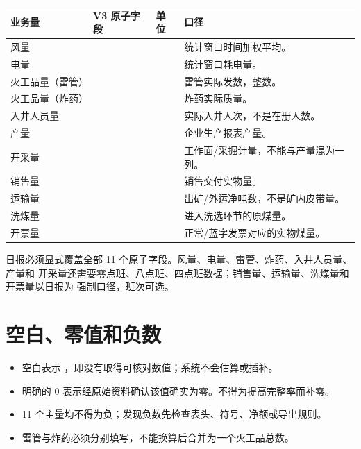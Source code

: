 \documentclass[UTF8,openany,zihao=-4,fontset=none]{ctexbook}
\begin{document}
\begin{longtable}{P{31mm}P{48mm}P{20mm}P{47mm}}
\toprule
\textbf{业务量} & \textbf{V3 原子字段} & \textbf{单位} & \textbf{口径}\\
\midrule
风量 &  &  & 统计窗口时间加权平均。\\
电量 &  &  & 统计窗口耗电量。\\
火工品量（雷管） &  &  & 雷管实际发数，整数。\\
火工品量（炸药） &  &  & 炸药实际质量。\\
入井人员量 &  &  & 实际入井人次，不是在册人数。\\
产量 &  &  & 企业生产报表产量。\\
开采量 &  &  & 工作面/采掘计量，不能与产量混为一列。\\
销售量 &  &  & 销售交付实物量。\\
运输量 &  &  & 出矿/外运净吨数，不是矿内皮带量。\\
洗煤量 &  &  & 进入洗选环节的原煤量。\\
开票量 &  &  & 正常/蓝字发票对应的实物煤量。\\
\bottomrule
\end{longtable}

日报必须显式覆盖全部 11 个原子字段。风量、电量、雷管、炸药、入井人员量、产量和
开采量还需要零点班、八点班、四点班数据；销售量、运输量、洗煤量和开票量以日报为
强制口径，班次可选。

\section{空白、零值和负数}

\begin{itemize}
  \item 空白表示 ，即没有取得可核对数值；系统不会估算或插补。
  \item 明确的 0 表示经原始资料确认该值确实为零。不得为提高完整率而补零。
  \item 11 个主量均不得为负；发现负数先检查表头、符号、净额或导出规则。
  \item 雷管与炸药必须分别填写，不能换算后合并为一个火工品总数。
\end{itemize}
\end{document}
